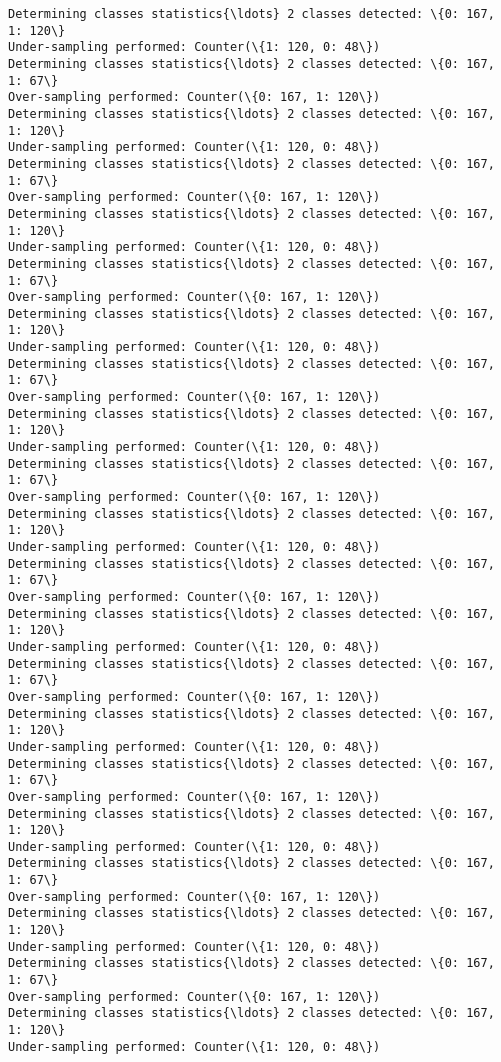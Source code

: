 \documentclass{article}
\begin{document}
\begin{Verbatim}[commandchars=\\\{\}]
Determining classes statistics{\ldots} 2 classes detected: \{0: 167, 1: 120\}
Under-sampling performed: Counter(\{1: 120, 0: 48\})
Determining classes statistics{\ldots} 2 classes detected: \{0: 167, 1: 67\}
Over-sampling performed: Counter(\{0: 167, 1: 120\})
Determining classes statistics{\ldots} 2 classes detected: \{0: 167, 1: 120\}
Under-sampling performed: Counter(\{1: 120, 0: 48\})
Determining classes statistics{\ldots} 2 classes detected: \{0: 167, 1: 67\}
Over-sampling performed: Counter(\{0: 167, 1: 120\})
Determining classes statistics{\ldots} 2 classes detected: \{0: 167, 1: 120\}
Under-sampling performed: Counter(\{1: 120, 0: 48\})
Determining classes statistics{\ldots} 2 classes detected: \{0: 167, 1: 67\}
Over-sampling performed: Counter(\{0: 167, 1: 120\})
Determining classes statistics{\ldots} 2 classes detected: \{0: 167, 1: 120\}
Under-sampling performed: Counter(\{1: 120, 0: 48\})
Determining classes statistics{\ldots} 2 classes detected: \{0: 167, 1: 67\}
Over-sampling performed: Counter(\{0: 167, 1: 120\})
Determining classes statistics{\ldots} 2 classes detected: \{0: 167, 1: 120\}
Under-sampling performed: Counter(\{1: 120, 0: 48\})
Determining classes statistics{\ldots} 2 classes detected: \{0: 167, 1: 67\}
Over-sampling performed: Counter(\{0: 167, 1: 120\})
Determining classes statistics{\ldots} 2 classes detected: \{0: 167, 1: 120\}
Under-sampling performed: Counter(\{1: 120, 0: 48\})
Determining classes statistics{\ldots} 2 classes detected: \{0: 167, 1: 67\}
Over-sampling performed: Counter(\{0: 167, 1: 120\})
Determining classes statistics{\ldots} 2 classes detected: \{0: 167, 1: 120\}
Under-sampling performed: Counter(\{1: 120, 0: 48\})
Determining classes statistics{\ldots} 2 classes detected: \{0: 167, 1: 67\}
Over-sampling performed: Counter(\{0: 167, 1: 120\})
Determining classes statistics{\ldots} 2 classes detected: \{0: 167, 1: 120\}
Under-sampling performed: Counter(\{1: 120, 0: 48\})
Determining classes statistics{\ldots} 2 classes detected: \{0: 167, 1: 67\}
Over-sampling performed: Counter(\{0: 167, 1: 120\})
Determining classes statistics{\ldots} 2 classes detected: \{0: 167, 1: 120\}
Under-sampling performed: Counter(\{1: 120, 0: 48\})
Determining classes statistics{\ldots} 2 classes detected: \{0: 167, 1: 67\}
Over-sampling performed: Counter(\{0: 167, 1: 120\})
Determining classes statistics{\ldots} 2 classes detected: \{0: 167, 1: 120\}
Under-sampling performed: Counter(\{1: 120, 0: 48\})
Determining classes statistics{\ldots} 2 classes detected: \{0: 167, 1: 67\}
Over-sampling performed: Counter(\{0: 167, 1: 120\})
Determining classes statistics{\ldots} 2 classes detected: \{0: 167, 1: 120\}
Under-sampling performed: Counter(\{1: 120, 0: 48\})
    \end{Verbatim}
\end{document}
